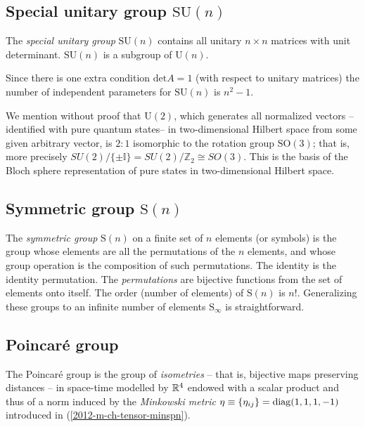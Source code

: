\subsection{Special unitary group $\textrm{SU}(n)$}

The {\em special unitary group} $\textrm{SU}(n)$
contains all  unitary
$n\times n$ matrices with unit determinant.
$\textrm{SU}(n)$ is a subgroup of $\textrm{U}(n)$.

Since there is one extra condition  $\textrm{det} A =1$
(with respect to unitary matrices)
the number of independent parameters for $\textrm{SU}(n)$ is  $n^2-1$.

We mention without proof that $\textrm{U}(2)$, which generates all normalized vectors -- identified with pure quantum states--
in two-dimensional
Hilbert space from some given arbitrary vector, is $2:1$ isomorphic to the rotation group $\textrm{SO}(3)$;
that is, more precisely $SU(2)/\{ \pm \mathbb{I}\} = SU(2)/\mathbb{Z}_2\cong SO(3)$.
This is the basis of the Bloch sphere representation of pure states in two-dimensional Hilbert space.

\subsection{Symmetric group $\textrm{S}(n)$}

The {\em symmetric group}
  $\textrm{S}(n)$ on a finite set of $n$ elements (or symbols)
is the group whose elements are all the permutations of the $n$ elements,
and whose group operation is the composition of such permutations.
The identity is the identity permutation.
The {\em permutations} are bijective functions from the set of elements onto itself.
The order (number of elements) of $\textrm{S}(n)$ is $n!$.
Generalizing these groups to an infinite number of elements $\textrm{S}_\infty$ is straightforward.



\subsection{Poincar\'e group}


The {Poincar\'e group} is the group of {\em isometries}
--
that is,
bijective maps preserving distances
--
in space-time modelled by ${\Bbb R}^4$
endowed with a scalar product and thus
of a norm induced by the
{\em Minkowski metric}
$
\eta \equiv \{\eta_{ij}\}={\rm diag} (1,1,1,-1)
$
introduced in (\ref{2012-m-ch-tensor-minspn}).

